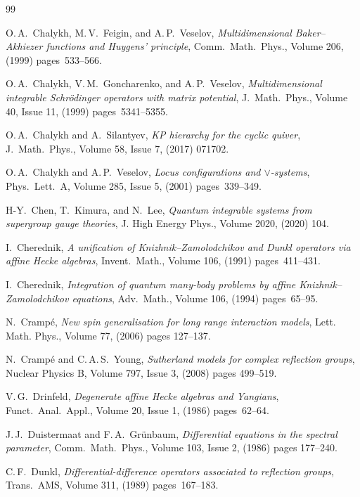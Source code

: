 \documentclass[12pt]{amsart}
\numberwithin{equation}{section}
\theoremstyle{definition}
\begin{document}
\begin{small}
\begin{thebibliography}{99}
{
O.\,A.\ Chalykh, M.\,V.\ Feigin, and A.\,P.\ Veselov, \textit{Multidimensional Baker--Akhiezer functions and Huygens’ principle}, Comm.\ Math.\ Phys., Volume 206, (1999) pages~533--566.

O.\,A.\ Chalykh, V.\,M.\ Goncharenko, and A.\,P.\ Veselov, \textit{Multidimensional integrable Schr\"odinger operators with matrix potential}, J.\ Math.\ Phys., Volume 40, Issue 11, (1999) pages~5341--5355.

O.\,A.\ Chalykh and A.\ Silantyev, \textit{
KP hierarchy for the cyclic quiver}, J.\ Math.\ Phys., Volume 58, Issue 7, (2017) 071702.


O.\,A.\ Chalykh and A.\,P.\ Veselov, \textit{Locus configurations and $\vee$-systems}, Phys.\ Lett.\ A, Volume 285, Issue 5, (2001) pages~339--349.

H-Y.\ Chen, T.\ Kimura, and N.\ Lee, \textit{Quantum integrable systems from supergroup gauge theories}, J. High Energy Phys., Volume 2020, (2020) 104.

I.\ Cherednik, {\em A unification of Knizhnik--Zamolodchikov and Dunkl operators via affine Hecke algebras}, Invent.\ Math., Volume 106, (1991) pages~411--431.

I.\ Cherednik, {\em Integration of quantum many-body problems by affine Knizhnik--Zamolodchikov equations}, Adv.\ Math., Volume 106, (1994) pages~65--95.

N.\ Cramp\'e, {\em New spin generalisation for long range interaction models}, Lett. Math. Phys., Volume 77, (2006) pages 127--137. 

N.\ Cramp\'e and C.\,A.\,S.\ Young, {\em  
Sutherland models for complex reflection groups},
Nuclear Physics B, Volume 797, Issue 3, (2008) pages 499--519. 



V.\,G.\ Drinfeld, \textit{Degenerate affine Hecke algebras and Yangians}, Funct.\ Anal.\ Appl., Volume 20, Issue 1, (1986) pages~62--64.

J.\,J.\ Duistermaat and F.\,A.\ Gr\"{u}nbaum, \textit{Differential equations in the spectral parameter}, Comm.\ Math.\ Phys., Volume 103, Issue 2, (1986) pages 177--240.

C.\,F.\ Dunkl, \textit{Differential-difference operators associated to reflection groups}, Trans.\ AMS, Volume 311, (1989) pages~167--183.

}
\end{thebibliography}
\end{small}
\end{document}
